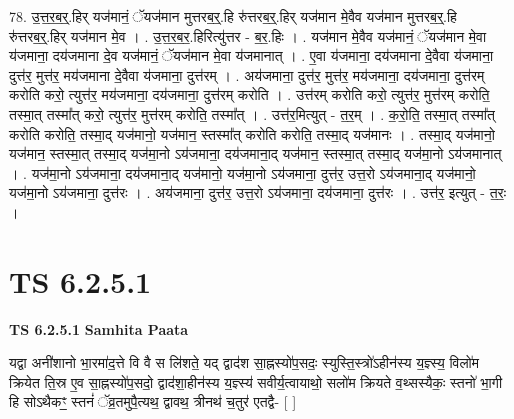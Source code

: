 \documentclass[17pt]{extarticle}
\begin{document}
78. उ॒त्त॒र॒ब॒र्॒.हिर् यज॑मानं॒ ॅयज॑मान मुत्तरब॒र्॒.हि रु॑त्तरब॒र्॒.हिर् यज॑मान मे॒वैव यज॑मान मुत्तरब॒र्॒.हि रु॑त्तरब॒र्॒.हिर् यज॑मान मे॒व । . उ॒त्त॒र॒ब॒र॒.हिरित्यु॑त्तर - ब॒र॒.हिः । . यज॑मान मे॒वैव यज॑मानं॒ ॅयज॑मान मे॒वा य॑जमाना॒ दय॑जमाना दे॒व यज॑मानं॒ ॅयज॑मान मे॒वा य॑जमानात् । . ए॒वा य॑जमाना॒ दय॑जमाना दे॒वैवा य॑जमाना॒ दुत्त॑र॒ मुत्त॑र॒ मय॑जमाना दे॒वैवा य॑जमाना॒ दुत्त॑रम् । . अय॑जमाना॒ दुत्त॑र॒ मुत्त॑र॒ मय॑जमाना॒ दय॑जमाना॒ दुत्त॑रम् करोति करो॒ त्युत्त॑र॒ मय॑जमाना॒ दय॑जमाना॒ दुत्त॑रम् करोति । . उत्त॑रम् करोति करो॒ त्युत्त॑र॒ मुत्त॑रम् करोति॒ तस्मा॒त् तस्मा᳚त् करो॒ त्युत्त॑र॒ मुत्त॑रम् करोति॒ तस्मा᳚त् । . उत्त॑र॒मित्युत् - त॒र॒म् । . क॒रो॒ति॒ तस्मा॒त् तस्मा᳚त् करोति करोति॒ तस्मा॒द् यज॑मानो॒ यज॑मान॒ स्तस्मा᳚त् करोति करोति॒ तस्मा॒द् यज॑मानः । . तस्मा॒द् यज॑मानो॒ यज॑मान॒ स्तस्मा॒त् तस्मा॒द् यज॑मा॒नो ऽय॑जमाना॒ दय॑जमाना॒द् यज॑मान॒ स्तस्मा॒त् तस्मा॒द् यज॑मा॒नो ऽय॑जमानात् । . यज॑मा॒नो ऽय॑जमाना॒ दय॑जमाना॒द् यज॑मानो॒ यज॑मा॒नो ऽय॑जमाना॒ दुत्त॑र॒ उत्त॒रो ऽय॑जमाना॒द् यज॑मानो॒ यज॑मा॒नो ऽय॑जमाना॒ दुत्त॑रः । . अय॑जमाना॒ दुत्त॑र॒ उत्त॒रो ऽय॑जमाना॒ दय॑जमाना॒ दुत्त॑रः । . उत्त॑र॒ इत्युत् - त॒रः॒ । \newline
\pagebreak
{}

\section{ TS 6.2.5.1 }

\textbf{TS 6.2.5.1 } \newline
\textbf{Samhita Paata} \newline

यद्वा अनी॑शानो भा॒रमा॑द॒त्ते वि वै स लि॑शते॒ यद् द्वाद॑श सा॒ह्नस्यो॑प॒सदः॒ स्युस्ति॒स्त्रो॑ऽहीन॑स्य य॒ज्ञ्स्य॒ विलो॑म क्रियेत ति॒स्र ए॒व सा॒ह्नस्यो॑प॒सदो॒ द्वाद॑शा॒हीन॑स्य य॒ज्ञ्स्य॑ सवीर्य॒त्वायाथो॒ सलो॑म क्रियते व॒थ्सस्यैकः॒ स्तनो॑ भा॒गी हि सोऽथैकꣳ॒॒ स्तनं॑ ॅव्र॒तमुपै॒त्यथ॒ द्वावथ॒ त्रीनथ॑ च॒तुर॑ एतद्वै- [  ] \newline
\end{document}
